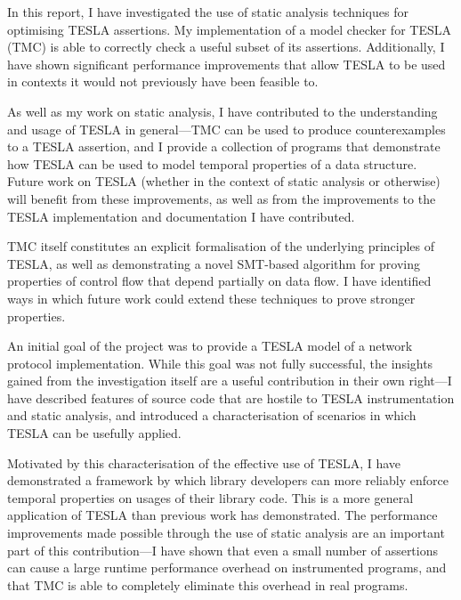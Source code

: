 In this report, I have investigated the use of static analysis techniques for
optimising TESLA assertions. My implementation of a model checker for TESLA
(TMC) is able to correctly check a useful subset of its assertions.
Additionally, I have shown significant performance improvements that allow TESLA
to be used in contexts it would not previously have been feasible to.

As well as my work on static analysis, I have contributed to the understanding
and usage of TESLA in general---TMC can be used to produce counterexamples to a
TESLA assertion, and I provide a collection of programs that demonstrate how
TESLA can be used to model temporal properties of a data structure. Future work
on TESLA (whether in the context of static analysis or otherwise) will benefit
from these improvements, as well as from the improvements to the TESLA
implementation and documentation I have contributed.

TMC itself constitutes an explicit formalisation of the underlying principles of
TESLA, as well as demonstrating a novel SMT-based algorithm for proving
properties of control flow that depend partially on data flow. I have identified
ways in which future work could extend these techniques to prove stronger
properties.

An initial goal of the project was to provide a TESLA model of a network
protocol implementation. While this goal was not fully successful, the insights
gained from the investigation itself are a useful contribution in their own
right---I have described features of source code that are hostile to TESLA
instrumentation and static analysis, and introduced a characterisation of
scenarios in which TESLA can be usefully applied.

Motivated by this characterisation of the effective use of TESLA, I have
demonstrated a framework by which library developers can more reliably enforce
temporal properties on usages of their library code. This is a more general
application of TESLA than previous work has demonstrated. The performance
improvements made possible through the use of static analysis are an important
part of this contribution---I have shown that even a small number of assertions
can cause a large runtime performance overhead on instrumented programs, and
that TMC is able to completely eliminate this overhead in real programs.
